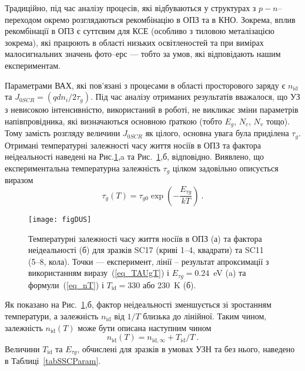 Традиційно, під час аналізу процесів, які відбуваються у структурах з $p-n$--переходом окремо розглядаються рекомбінацію в ОПЗ та в КНО.
Зокрема, вплив рекомбінації в ОПЗ є суттєвим для КСЕ (особливо з тиловою металізацією зокрема), які працюють в області низьких
освітленостей та при вимірах малосигнальних значень фото--ерс \cite{Sach:UPJ2016} --- тобто за умов, які відповідають нашим експериментам.


Параметрами ВАХ, які пов'язані з процесами в області просторового заряду є $n_{\mathrm{id}}$ та $J_{0SCR}=(qdn_i/2\tau_{g})$.
Під час аналізу отриманих результатів вважалося, що УЗ з невисокою інтенсивністю, використаний в роботі, не
викликає зміни параметрів напівпровідника, які визначаються основною ґраткою (тобто  $E_g$, $N_c$, $N_v$ тощо).
Тому замість розгляду величини $J_{0SCR}$ як цілого, основна увага була приділена $\tau_{g}$.
Отримані температурні залежності часу життя носіїв в ОПЗ та фактора неідеальності наведені на Рис.\ref{figDUS},a та Рис.~\ref{figDUS},б, відповідно.
Виявлено, що експериментальна температурна залежність $\tau_{g}$ цілком задовільно описується виразом
\begin{equation}
\label{eq_TAUgT}
    \tau_{g}(T)=\tau_{g0}\exp\left(-\frac{E_{\tau g}}{kT}\right)\:.
\end{equation}

\begin{figure}
\center
\texttt{[image: figDUS]}%
\caption{\label{figDUS}
Температурні залежності часу життя носіїв в ОПЗ (а) та фактора неідеальності (б)
для зразків SC17 (криві 1--4, квадрати) та SC11 (5--8, кола).
\FigCaptionSSC
Точки --- експеримент,
лінії -- результат апроксимації з використанням виразу~(\ref{eq_TAUgT}) і $E_{\tau g}=0.24$~eV (a) та
формули~(\ref{eq_nT}) і $T_\mathrm{id}=330$ або 230~K (б).
}%
\end{figure}

Як показано на Рис.~\ref{figDUS},б, фактор неідеальності зменшується зі зростанням температури, а залежність
$n_{\mathrm{id}}$ від $1/T$  близька до лінійної.
Таким чином, залежність $n_{\mathrm{id}}(T)$ може бути описана наступним чином
\begin{equation}
\label{eq_nT}
    n_{\mathrm{id}}(T)=n_{\mathrm{id},\infty}+T_{\mathrm{id}}/T\:.
\end{equation}
Величини $T_{\mathrm{id}}$ та $E_{\tau g}$, обчислені для зразків в умовах УЗН та без нього, наведено в Таблиці~\ref{tabSSCParam}.


